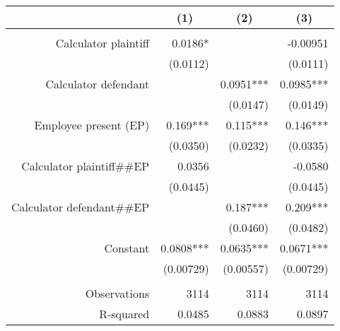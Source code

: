 \begin{tabular}{rrrr}
\toprule
\multicolumn{1}{c}{} & \multicolumn{1}{c}{(1)} & \multicolumn{1}{c}{(2)} & \multicolumn{1}{c}{(3)} \\
\midrule
      &       &       &  \\
Calculator plaintiff & 0.0186* &       & -0.00951 \\
      & (0.0112) &       & (0.0111) \\
Calculator defendant &       & 0.0951*** & 0.0985*** \\
      &       & (0.0147) & (0.0149) \\
Employee present (EP) & 0.169*** & 0.115*** & 0.146*** \\
      & (0.0350) & (0.0232) & (0.0335) \\
Calculator plaintiff\#\#EP & 0.0356 &       & -0.0580 \\
      & (0.0445) &       & (0.0445) \\
Calculator defendant\#\#EP &       & 0.187*** & 0.209*** \\
      &       & (0.0460) & (0.0482) \\
Constant  & 0.0808*** & 0.0635*** & 0.0671*** \\
      & (0.00729) & (0.00557) & (0.00729) \\
      &       &       &  \\
Observations & 3114  & 3114  & 3114 \\
R-squared & 0.0485 & 0.0883 & 0.0897 \\
\bottomrule
\end{tabular}%

